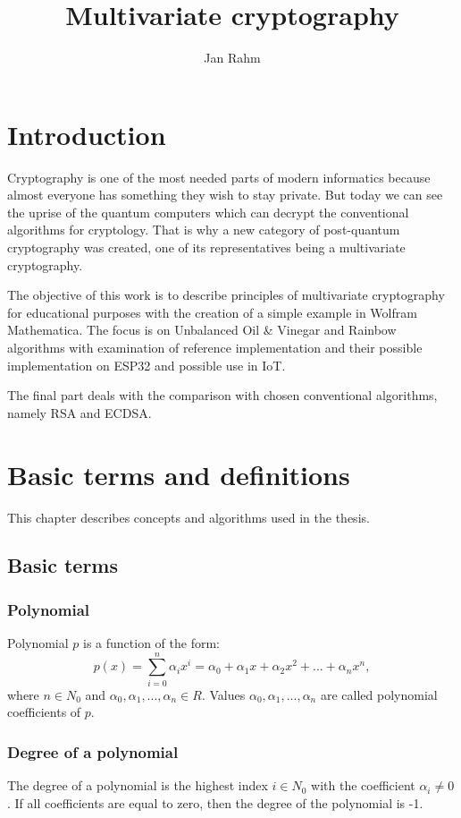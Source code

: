 \documentclass[thesis=M,english]{FITthesis}[2019/12/23]
\title{Multivariate cryptography}
\author{Jan Rahm} %
\begin{document}

\chapter{Introduction}
Cryptography is one of the most needed parts of modern informatics because almost everyone has something they wish to stay private. But today we can see the uprise of the quantum computers which can decrypt the conventional algorithms for cryptology. That is why a new category of post-quantum cryptography was created, one of its representatives being a multivariate cryptography.

The objective of this work is to describe principles of multivariate cryptography for educational purposes with the creation of a simple example in Wolfram Mathematica. The focus is on Unbalanced Oil \& Vinegar and Rainbow algorithms with examination of reference implementation and their possible implementation on ESP32 and possible use in IoT.

The final part deals with the comparison with chosen conventional algorithms, namely RSA and ECDSA. 

\chapter{Basic terms and definitions}
This chapter describes concepts and algorithms used in the thesis.

\section{Basic terms}
\subsection{Polynomial}
Polynomial $p$ is a function of the form:
\[
p(x) = \sum\limits_{i=0}^n {\alpha_ix^i} = \alpha_0 + \alpha_1x + \alpha_2x^2 + ... + \alpha_nx^n,
\]
where $n \in N_0$ and $\alpha_0, \alpha_1, ..., \alpha_n \in R$. Values $\alpha_0, \alpha_1, ..., \alpha_n$ are called polynomial coefficients of $p$.

\subsection{Degree of a polynomial}
The degree of a polynomial is the highest index $i \in N_0$ with the coefficient $\alpha_i \ne 0$. If all coefficients are equal to zero, then the degree of the polynomial is -1.
\end{document}
